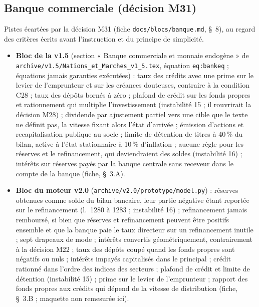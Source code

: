 \documentclass[11pt,a4paper]{article}
\begin{document}
\subsection*{Banque commerciale (décision M31)}
Pistes écartées par la décision M31 (fiche \nolinkurl{docs/blocs/banque.md}, \S~8), au regard des critères écrits avant l'instruction et du principe de simplicité.
\begin{itemize}
\item \textbf{Bloc de la v1.5} (section « Banque commerciale et monnaie endogène » de \nolinkurl{archive/v1.5/Nations_et_Marches_v1_5.tex}, équation \texttt{eq:bankeq} ; équations jamais garanties exécutées) : taux des crédits avec une prime sur le levier de l'emprunteur et sur les créances douteuses, contraire à la condition C28 ; taux des dépôts bornés à zéro ; plafond de crédit sur les fonds propres et rationnement qui multiplie l'investissement (instabilité 15 ; il rouvrirait la décision M28) ; dividende par ajustement partiel vers une cible que le texte ne définit pas, la vitesse fixant alors l'état d'arrivée ; émission d'actions et recapitalisation publique au socle ; limite de détention de titres à 40\,\% du bilan, active à l'état stationnaire à 10\,\% d'inflation ; aucune règle pour les réserves et le refinancement, qui deviendraient des soldes (instabilité 16) ; intérêts sur réserves payés par la banque centrale sans receveur dans le compte de la banque (fiche, \S~3.A).
\item \textbf{Bloc du moteur v2.0} (\texttt{archive/v2.0/prototype/model.py}) : réserves obtenues comme solde du bilan bancaire, leur partie négative étant reportée sur le refinancement (l.~1280 à 1283 ; instabilité 16) ; refinancement jamais remboursé, si bien que réserves et refinancement peuvent être positifs ensemble et que la banque paie le taux directeur sur un refinancement inutile ; sept drapeaux de mode ; intérêts convertis géométriquement, contrairement à la décision M22 ; taux des dépôts coupé quand les fonds propres sont négatifs ou nuls ; intérêts impayés capitalisés dans le principal ; crédit rationné dans l'ordre des indices des secteurs ; plafond de crédit et limite de détention (instabilité 15) ; prime sur le levier de l'emprunteur ; rapport des fonds propres aux crédits qui dépend de la vitesse de distribution (fiche, \S~3.B ; maquette non remesurée ici).

\end{itemize}
\end{document}

